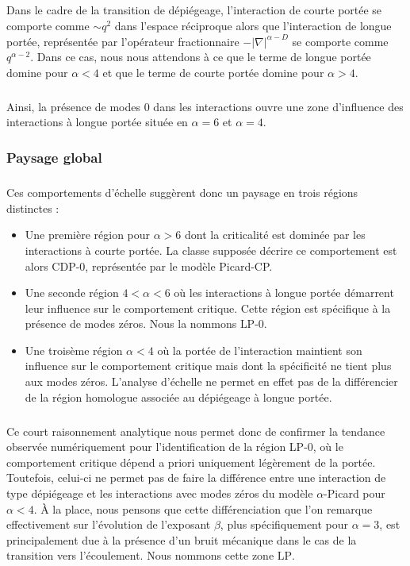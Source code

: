 \subparagraph{}Dans le cadre de la transition de dépiégeage, l'interaction de courte portée se comporte comme $\sim q^2$ dans l'espace réciproque alors que l'interaction de longue portée, représentée par l'opérateur fractionnaire $-|\nabla|^{\alpha-D}$ se comporte comme $q^{\alpha-2}$. Dans ce cas, nous nous attendons à ce que le terme de longue portée domine pour $\alpha < 4$ et que le terme de courte portée domine pour $\alpha > 4$.

\subparagraph{}Ainsi, la présence de modes 0 dans les interactions ouvre une zone d'influence des interactions à longue portée située en $\alpha = 6$ et $\alpha = 4$.

\subsubsection{Paysage global}

\subparagraph{}Ces comportements d'échelle suggèrent donc un paysage en trois régions distinctes :

\begin{itemize}
	\item Une première région pour $\alpha>6$ dont la criticalité est dominée par les interactions à courte portée. La classe supposée décrire ce comportement est alors CDP-0, représentée par le modèle Picard-CP.
	\item Une seconde région $4<\alpha<6$ où les interactions à longue portée démarrent leur influence sur le comportement critique. Cette région est spécifique à la présence de modes zéros. Nous la nommons $\text{LP-0}$.
	\item Une troisème région $\alpha <4$ où la portée de l'interaction maintient son influence sur le comportement critique mais dont la spécificité ne tient plus aux modes zéros. L'analyse d'échelle ne permet en effet pas de la différencier de la région homologue associée au dépiégeage à longue portée.
\end{itemize}

\subparagraph{}Ce court raisonnement analytique nous permet donc de confirmer la tendance observée numériquement pour l'identification de la région LP-0, où le comportement critique dépend a priori uniquement légèrement de la portée. Toutefois, celui-ci ne permet pas de faire la différence entre une interaction de type dépiégeage et les interactions avec modes zéros du modèle $\alpha$-Picard pour $\alpha<4$. \`A la place, nous pensons que cette différenciation que l'on remarque effectivement sur l'évolution de l'exposant $\beta$, plus spécifiquement pour $\alpha = 3$, est principalement due à la présence d'un bruit mécanique dans le cas de la transition vers l'écoulement. Nous nommons cette zone $\text{LP}$.

